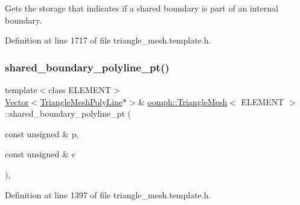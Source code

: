 Gets the storage that indicates if a shared boundary is part of an internal boundary. 



Definition at line 1717 of file triangle\+\_\+mesh.\+template.\+h.

\mbox{\label{classoomph_1_1TriangleMesh_a7573f770bc106d9b211b52faa49e3d29}} 
\subsubsection{\texorpdfstring{shared\+\_\+boundary\+\_\+polyline\+\_\+pt()}{shared\_boundary\_polyline\_pt()}\hspace{0.1cm}{\footnotesize\ttfamily [1/2]}}
{\footnotesize\ttfamily template$<$class E\+L\+E\+M\+E\+NT$>$ \\
\hyperlink{classoomph_1_1Vector}{Vector}$<$\hyperlink{classoomph_1_1TriangleMeshPolyLine}{Triangle\+Mesh\+Poly\+Line}$\ast$$>$\& \hyperlink{classoomph_1_1TriangleMesh}{oomph\+::\+Triangle\+Mesh}$<$ E\+L\+E\+M\+E\+NT $>$\+::shared\+\_\+boundary\+\_\+polyline\+\_\+pt (\begin{DoxyParamCaption}\item[{const unsigned \&}]{p,  }\item[{const unsigned \&}]{c }\end{DoxyParamCaption})\hspace{0.3cm}{\ttfamily [inline]}, {\ttfamily [protected]}}



Definition at line 1397 of file triangle\+\_\+mesh.\+template.\+h.

\mbox{\label{classoomph_1_1TriangleMesh_a8a57b12f74e99baf923fa106f654ae4d}} 
